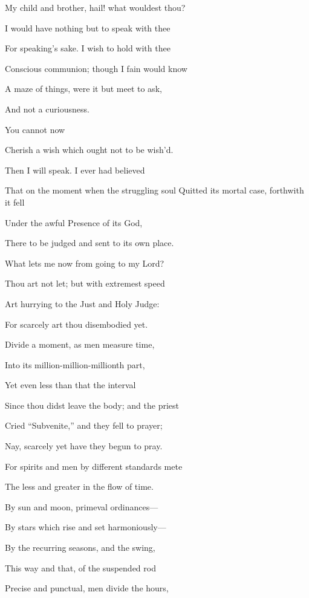 My child and brother, hail! what wouldest thou?


I would have nothing but to speak with thee

For speaking's sake. I wish to hold with thee

Conscious communion; though I fain would know

A maze of things, were it but meet to ask,

And not a curiousness.


You cannot now

Cherish a wish which ought not to be wish'd.


Then I will speak. I ever had believed

That on the moment when the struggling soul Quitted its mortal case, forthwith it fell

Under the awful Presence of its God,

There to be judged and sent to its own place.

What lets me now from going to my Lord?


Thou art not let; but with extremest speed

Art hurrying to the Just and Holy Judge:

For scarcely art thou disembodied yet.

Divide a moment, as men measure time,

Into its million-million-millionth part,

Yet even less than that the interval

Since thou didst leave the body; and the priest

Cried ``Subvenite,'' and they fell to prayer;

Nay, scarcely yet have they begun to pray.

For spirits and men by different standards mete

The less and greater in the flow of time.

By sun and moon, primeval ordinances—

By stars which rise and set harmoniously—

By the recurring seasons, and the swing,

This way and that, of the suspended rod

Precise and punctual, men divide the hours,

